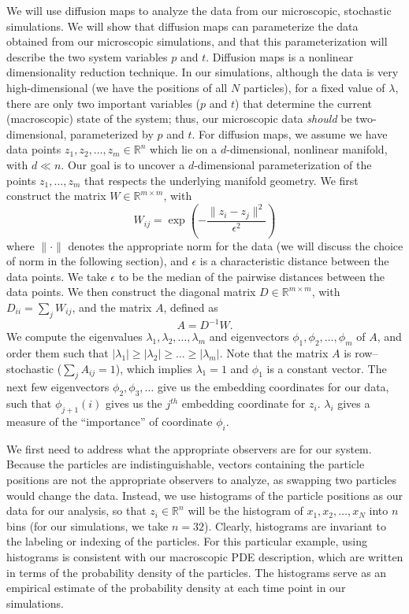 \documentclass[prl, reprint, final, showkeys]{revtex4-1}
\begin{document}
We will use diffusion maps \cite{coifman2005geometric} to analyze the data from our microscopic, stochastic simulations.
%
We will show that diffusion maps can parameterize the data obtained from our microscopic simulations, and that this parameterization will describe the two system variables $p$ and $t$.
%
Diffusion maps is a nonlinear dimensionality reduction technique.
%
In our simulations, although the data is very high-dimensional (we have the positions of all $N$ particles), for a fixed value of $\lambda$, there are only two important variables ($p$ and $t$) that determine the current (macroscopic) state of the system; thus, our microscopic data {\em should} be two-dimensional, parameterized by $p$ and $t$.
%
For diffusion maps, we assume we have data points $z_1, z_2, \dots, z_m \in \mathbb{R}^n$ which lie on a $d$-dimensional, nonlinear manifold, with $d \ll n$. 
%
Our goal is to uncover a $d$-dimensional parameterization of the points $z_1, \dots, z_m$ that respects the underlying manifold geometry.
%
We first construct the matrix $W \in \mathbb{R}^{m \times m}$, with
\begin{equation} \label{eq:W}
W_{ij} = \exp \left( -\frac{\|z_i - z_j \|^2}{\epsilon^2} \right)
\end{equation}
where $\| \cdot \|$ denotes the appropriate norm for the data (we will discuss the choice of norm in the following section), and $\epsilon$ is a characteristic distance between the data points.
%
We take $\epsilon$ to be the median of the pairwise distances between the data points.
%
We then construct the diagonal matrix $D \in \mathbb{R}^{m \times m}$, with $D_{ii} = \sum_j W_{ij}$, and the matrix $A$, defined as
\begin{equation}
A = D^{-1} W.
\end{equation}
%
We compute the eigenvalues $\lambda_1, \lambda_2, \dots, \lambda_m$ and eigenvectors $\phi_1, \phi_2, \dots, \phi_m$ of $A$, and order them such that $|\lambda_1| \ge |\lambda_2| \ge \dots \ge |\lambda_m|$. 
%
Note that the matrix $A$ is row--stochastic ($\sum_j A_{ij} = 1$), which implies $\lambda_1 = 1$ and $\phi_1$ is a constant vector.
%
The next few eigenvectors $\phi_2, \phi_3, \dots$ give us the embedding coordinates for our data, such that $\phi_{j+1}(i)$ gives us the $j^{th}$ embedding coordinate for $z_i$.
%
$\lambda_i$ gives a measure of the ``importance'' of coordinate $\phi_i$.

We first need to address what the appropriate observers are for our system.
%
Because the particles are indistinguishable, vectors containing the particle positions are not the appropriate observers to analyze, as swapping two particles would change the data.
%
Instead, we use histograms of the particle positions as our data for our analysis, so that $z_i \in \mathbb{R}^n$ will be the histogram of $x_1, x_2, \dots, x_N$ into $n$ bins (for our simulations, we take $n=32$).
%
Clearly, histograms are invariant to the labeling or indexing of the particles.
%
For this particular example, using histograms is consistent with our macroscopic PDE description, which are written in terms of the probability density of the particles.
%
The histograms serve as an empirical estimate of the probability density at each time point in our simulations.
\end{document}
